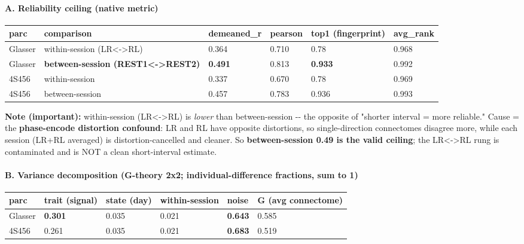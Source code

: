 \paragraph{A. Reliability ceiling (native metric)}\label{a-reliability-ceiling-native-metric}

{\def\LTcaptype{none} %
\begin{longtable}[]{@{}llllll@{}}
\toprule\noalign{}
parc & comparison & demeaned\_r & pearson & top1 (fingerprint) & avg\_rank \\
\midrule\noalign{}
\endhead
\bottomrule\noalign{}
\endlastfoot
Glasser & within-session (LR\textless-\textgreater RL) & 0.364 & 0.710 & 0.78 & 0.968 \\
Glasser & \textbf{between-session (REST1\textless-\textgreater REST2)} & \textbf{0.491} & 0.813 & \textbf{0.933} & 0.992 \\
4S456 & within-session & 0.337 & 0.670 & 0.78 & 0.969 \\
4S456 & between-session & 0.457 & 0.783 & 0.936 & 0.993 \\
\end{longtable}
}

\textbf{Note (important):} within-session (LR\textless-\textgreater RL) is \emph{lower} than between-session -\/- the opposite of "shorter interval = more reliable." Cause = the \textbf{phase-encode distortion confound}: LR and RL have opposite distortions, so single-direction connectomes disagree more, while each session (LR+RL averaged) is distortion-cancelled and cleaner. So \textbf{between-session 0.49 is the valid ceiling}; the LR\textless-\textgreater RL rung is contaminated and is NOT a clean short-interval estimate.

\paragraph{B. Variance decomposition (G-theory 2x2; individual-difference fractions, sum to 1)}\label{b-variance-decomposition-g-theory-2x2-individual-difference-fractions-sum-to-1}

{\def\LTcaptype{none} %
\begin{longtable}[]{@{}llllll@{}}
\toprule\noalign{}
parc & trait (signal) & state (day) & within-session & \textbf{noise} & G (avg connectome) \\
\midrule\noalign{}
\endhead
\bottomrule\noalign{}
\endlastfoot
Glasser & \textbf{0.301} & 0.035 & 0.021 & \textbf{0.643} & 0.585 \\
4S456 & 0.261 & 0.035 & 0.021 & \textbf{0.683} & 0.519 \\
\end{longtable}
}

